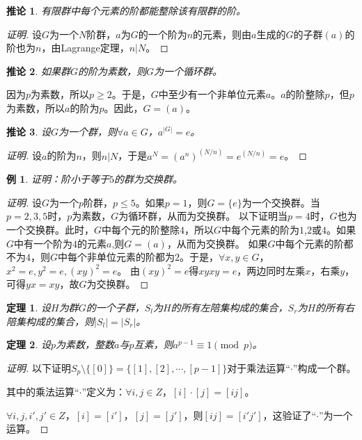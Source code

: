 \documentclass{article}
\newtheorem{Thm}{定理}
\newtheorem*{Example}{例}
\newtheorem{Cor}{推论}
\begin{document}
\begin{CJK*}{UTF8}{gbsn}
\begin{Cor}
有限群中每个元素的阶都能整除该有限群的阶。
\end{Cor}
\begin{proof}[证明]
  设$G$为一个$N$阶群，$a$为$G$的一个阶为$n$的元素，则由$a$生成的$G$的子群$(a)$的阶也为$n$，由Lagrange定理，$n|N$。
\end{proof}
\begin{Cor}
  如果群$G$的阶为素数，则$G$为一个循环群。
\end{Cor}
因为$p$为素数，所以$p\geq 2$。于是，$G$中至少有一个非单位元素$a$。$a$的阶整除$p$，但$p$为素数，所以$a$的阶为$p$。因此，$G=(a)$。
\begin{Cor}
  设$G$为一个群，则$\forall a\in G$，$a^{|G|}=e$。
\end{Cor}
\begin{proof}[证明]
  设$a$的阶为$n$，则$n|N$，于是$a^N=(a^n)^{(N/n)}=e^{(N/n)}=e$。
\end{proof}
\begin{Example}
  证明：阶小于等于$5$的群为交换群。
\end{Example}
\begin{proof}[证明]
  设$G$为一个$p$阶群，$p\leq 5$。如果$p=1$，则$G=\{e\}$为一个交换群。当$p=2,3,5$时，$p$为素数，$G$为循环群，从而为交换群。
  以下证明当$p=4$时，$G$也为一个交换群。此时，$G$中每个元的阶整除$4$，所以$G$中每个元素的阶为$1$,$2$或$4$。如果$G$中有一个阶为$4$的元素$a$,则$G=(a)$，从而为交换群。
  如果$G$中每个元素的阶都不为$4$，则$G$中每个非单位元素的阶都为$2$。于是，$\forall x,y\in G$，$x^2=e,y^2=e,(xy)^2=e$。
  由$(xy)^2=e$得$xyxy=e$，两边同时左乘$x$，右乘$y$，可得$yx=xy$，故$G$为交换群。

\end{proof}
\begin{Thm}
  设$H$为群$G$的一个子群，$S_l$为$H$的所有左陪集构成的集合，$S_r$为$H$的所有右陪集构成的集合，则$|S_l|=|S_r|$。
\end{Thm}

\begin{Thm}
  设$p$为素数，整数$a$与$p$互素，则$a^{p-1}\equiv 1 \pmod p$。
\end{Thm}
\begin{proof}[证明]
  以下证明$S_p\setminus \{[0]\}=\{[1],[2],\cdots,[p-1]\}$对于乘法运算“$\cdot$”构成一个群。

  其中的乘法运算“$\cdot$”定义为：$\forall i,j\in Z$，$[i]\cdot [j]=[ij]$。

  $\forall i,j,i',j'\in Z$，$[i]=[i']$，$[j]=[j']$，则$[ij]=[i'j']$，这验证了“$\cdot$”为一个运算。


\end{proof}
\end{CJK*}
\end{document}
